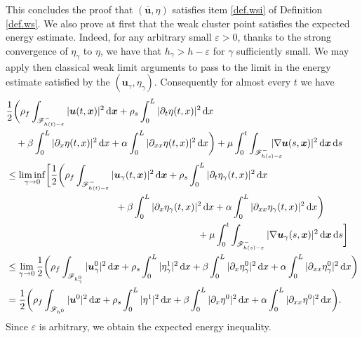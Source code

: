 \documentclass[10pt]{amsart}
\let\mathcal\mathscr
\theoremstyle{remark}
\theoremstyle{definition}
\newcommand{\ug}{\boldsymbol{u}}
\newcommand{\xg}{\boldsymbol{x}}
\newcommand{\dd}{\,\mathrm{d}}
\begin{document}
This concludes the proof that $(\overline{\ug},\eta)$ satisfies item \eqref{def.wsi} of Definition
\ref{def.ws}.
We also prove at first that the weak cluster point
satisfies the expected energy estimate. Indeed, for any arbitrary small $\varepsilon >0$, thanks to the strong convergence of $\eta_{\gamma}$ to $\eta$, we have that $h_{\gamma} > h- \varepsilon$ for $\gamma$ sufficiently small. We may apply then classical weak limit arguments to pass to the limit in the energy estimate satisfied by the $({\ug}_{\gamma},\eta_{\gamma})$. Consequently for almost every $t$ we have
\[
\begin{aligned}
&\frac{1}{2}\biggl(\rho_{f}\int_{\mathcal{F}^{-}_{h(t)-\varepsilon}}\vert\ug(t, \xg) \vert^{2} \dd\xg + \rho_{s}\int_{0}^{L}\vert\partial_{t}\eta(t, x) \vert^{2} \dd x\\
& \quad +\beta\int_{0}^{L}\vert\partial_{x}\eta(t, x) \vert^{2} \dd x+\alpha\int_{0}^{L}\vert\partial_{xx}\eta(t, x) \vert^{2} \dd x\biggr)+ \mu\int_0^t\int_{\mathcal{F}^{-}_{h(s)-\varepsilon}}\hspace*{-5mm}\vert \nabla\ug(s, \xg) \vert^{2} \dd\xg\dd s \\
& \leq
\liminf_{\gamma \to 0} \biggl[ \frac{1}{2}\biggl(\rho_{f}\int_{\mathcal{F}^{-}_{h(t)-\varepsilon}}\vert\ug_{\gamma}(t, \xg) \vert^{2} \dd\xg + \rho_{s}\int_{0}^{L}\vert\partial_{t}\eta_{\gamma}(t, x) \vert^{2} \dd x \\
& \hspace*{4cm} +\beta\int_{0}^{L}\vert\partial_{x}\eta_{\gamma}(t, x) \vert^{2} \dd x +\alpha\int_{0}^{L}\vert\partial_{xx}\eta_{\gamma}(t, x) \vert^{2} \dd x \biggr) \\
& \hspace*{7cm} + \mu\int_0^t\int_{\mathcal{F}^{-}_{h(s)-\varepsilon}}\vert \nabla\ug_{\gamma}(s, \xg) \vert^{2} \dd\xg\dd s\biggr] \\
& \leq \lim_{\gamma \to 0}
\frac{1}{2}\biggl(\rho_{f}\int_{\mathcal{F}_{h^0_{\gamma}}}\vert\ug^0_{\gamma}\vert^{2} \dd \xg+ \rho_{s}\int_{0}^{L}\vert\eta^1_{\gamma}\vert^{2}\dd x+\beta\int_{0}^{L}\vert\partial_{x}\eta^0_{\gamma}\vert^{2}\dd x+\alpha\int_{0}^{L}\vert\partial_{xx}\eta^0_{\gamma}\vert^{2}\dd x\biggr)
\\
&
=\frac{1}{2}\biggl(\rho_{f}\int_{\mathcal{F}_{h^0}}\vert\ug^0\vert^{2} \dd \xg+ \rho_{s}\int_{0}^{L}\vert\eta^1\vert^{2}\dd x +\beta\int_{0}^{L}\vert\partial_{x}\eta^0\vert^{2}\dd x+\alpha\int_{0}^{L}\vert\partial_{xx}\eta^0\vert^{2}\dd x\biggr).
\end{aligned}
\]
Since $\varepsilon$ is arbitrary, we obtain the expected energy inequality.
\end{document}
